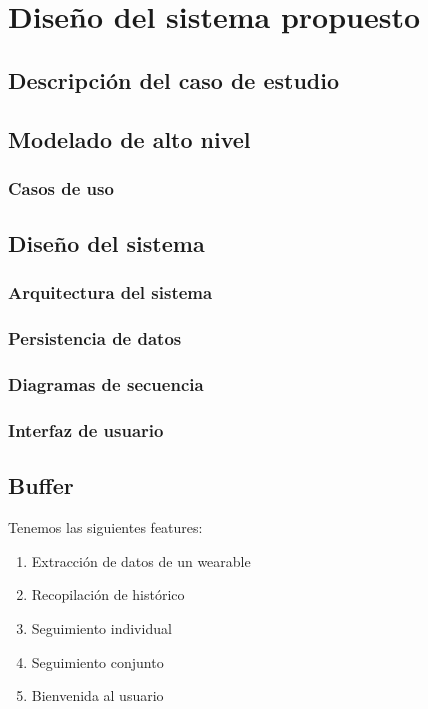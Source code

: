 \chapter{Diseño del sistema propuesto}
\label{chapter:disenio}


\section{Descripción del caso de estudio} \label{section:CasoEstudio}


\section{Modelado de alto nivel}
    \subsection{Casos de uso}

\section{Diseño del sistema}

    \subsection{Arquitectura del sistema}
    \subsection{Persistencia de datos}
    \subsection{Diagramas de secuencia}
    \subsection{Interfaz de usuario}

\section{Buffer}

Tenemos las siguientes features:
\begin{enumerate}
    \item Extracción de datos de un \gls{wearable}
    \item Recopilación de histórico
    \item Seguimiento individual
    \item Seguimiento conjunto
    \item Bienvenida al usuario
\end{enumerate}

